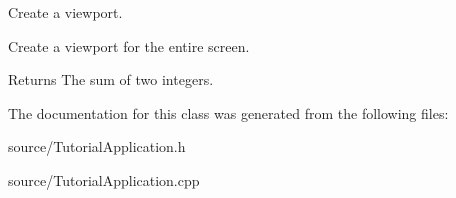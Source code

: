 Create a viewport. 

Create a viewport for the entire screen.

\begin{DoxyReturn}{Returns}
The sum of two integers. 
\end{DoxyReturn}


The documentation for this class was generated from the following files\+:\begin{DoxyCompactItemize}
\item 
source/Tutorial\+Application.\+h\item 
source/Tutorial\+Application.\+cpp\end{DoxyCompactItemize}
